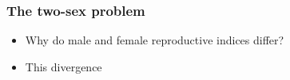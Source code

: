 \documentclass{beamer}
\begin{document}

\begin{frame}
\frametitle{The two-sex problem}
\begin{itemize}
  \item Why do male and female reproductive indices differ?
  \item This divergence
\end{itemize}
\end{frame}

\end{document}
